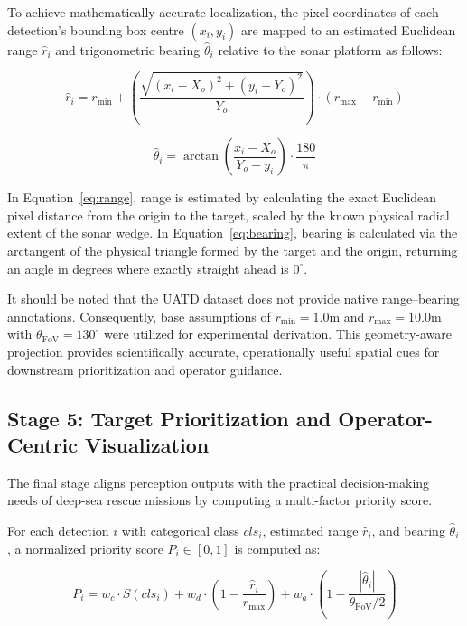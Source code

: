 \documentclass[conference]{IEEEtran}
\begin{document}
To achieve mathematically accurate localization, the pixel coordinates of each detection's bounding box centre $(x_i, y_i)$ are mapped to an estimated Euclidean range $\hat{r}_i$ and trigonometric bearing $\hat{\theta}_i$ relative to the sonar platform as follows:

\begin{equation}
\hat{r}_i = r_{\min} + \left( \frac{\sqrt{(x_i - X_o)^2 + (y_i - Y_o)^2}}{Y_o} \right) \cdot (r_{\max} - r_{\min})
\label{eq:range}
\end{equation}

\begin{equation}
\hat{\theta}_i = \arctan\left(\frac{x_i - X_o}{Y_o - y_i}\right) \cdot \frac{180}{\pi}
\label{eq:bearing}
\end{equation}

In Equation~\eqref{eq:range}, range is estimated by calculating the exact Euclidean pixel distance from the origin to the target, scaled by the known physical radial extent of the sonar wedge. In Equation~\eqref{eq:bearing}, bearing is calculated via the arctangent of the physical triangle formed by the target and the origin, returning an angle in degrees where exactly straight ahead is $0^\circ$. 

It should be noted that the UATD dataset does not provide native range--bearing annotations. Consequently, base assumptions of $r_{\min} = 1.0\text{m}$ and $r_{\max} = 10.0\text{m}$ with $\theta_{\text{FoV}} = 130^\circ$ were utilized for experimental derivation. This geometry-aware projection provides scientifically accurate, operationally useful spatial cues for downstream prioritization and operator guidance.

\subsection{Stage 5: Target Prioritization and Operator-Centric Visualization}

The final stage aligns perception outputs with the practical decision-making needs of deep-sea rescue missions by computing a multi-factor priority score.

For each detection $i$ with categorical class $cls_i$, estimated range $\hat{r}_i$, and bearing $\hat{\theta}_i$, a normalized priority score $P_i \in [0, 1]$ is computed as:

\begin{equation}
P_i = w_{c} \cdot S(cls_i) + w_{d} \cdot \left(1 - \frac{\hat{r}_i}{r_{\max}}\right) + w_{a} \cdot \left(1 - \frac{|\hat{\theta}_i|}{\theta_{\text{FoV}}/2}\right)
\label{eq:priority}
\end{equation}
\end{document}
